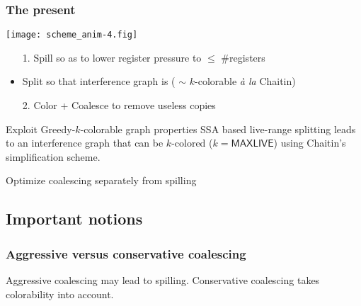 \begin{frame}[label=past]
  \frametitle{The present}
\texttt{[image: scheme\_anim-4.fig]}
  \begin{itemize}
  \item[1.] \alert{Spill} so as to lower register pressure to $\leq$ \#registers
  \item \alert{Split} so that interference graph is  
    ( $\sim$ $k$-colorable {\it \`a la} Chaitin)
  \item[2.] \alert{Color + Coalesce} to remove useless copies
  \end{itemize}

\begin{alertblock}{Exploit Greedy-$k$-colorable graph properties}
SSA based live-range splitting leads to an interference graph that can be $k$-colored ($k = \textsf{MAXLIVE}$) using Chaitin's simplification scheme. 
\end{alertblock}

\begin{alertblock}{Optimize coalescing separately from spilling}
\end{alertblock}
\end{frame}



\subsection*{Important notions}


\subsubsection*{Aggressive versus conservative coalescing}
\begin{frame}[label=past]
   \alert<1-3|handout>{Aggressive}
  coalescing may lead to spilling. \alert<4|handout>{Conservative} coalescing
  takes colorability into account.  

\vfill
  \begin{center}\end{center}
\end{frame}


